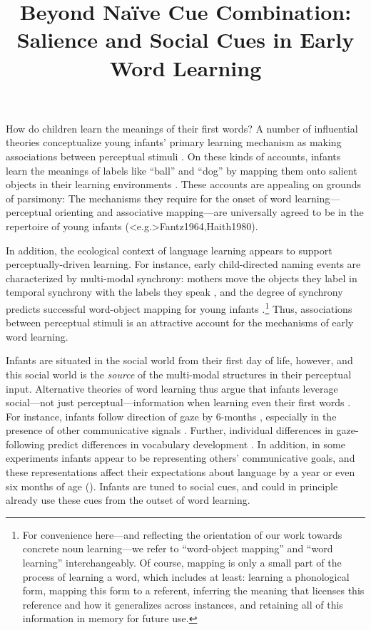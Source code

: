 \documentclass[man,floatsintext]{apa6}
\title{Beyond Na\"{i}ve Cue Combination: Salience and Social Cues in Early Word Learning}
\author{}
\affiliation{}
\begin{document}
\maketitle


How do children learn the meanings of their first words? A number of influential theories conceptualize young infants' primary learning mechanism as making associations between perceptual stimuli \cite{Piaget1952, Vygotsky1978}. On these kinds of accounts, infants learn the meanings of labels like ``ball'' and ``dog'' by mapping them onto salient objects in their learning environments \cite{Werker1998,Smith2000}. These accounts are appealing on grounds of parsimony: The mechanisms they require for the onset of word learning---perceptual orienting and associative mapping---are universally agreed to be in the repertoire of young infants (\citeNP<e.g.>{Fantz1964,Haith1980}). 

In addition, the ecological context of language learning appears to support perceptually-driven learning. For instance, early child-directed naming events are characterized by multi-modal synchrony: mothers move the objects they label in temporal synchrony with the labels they speak \cite{Gogate2000}, and the degree of synchrony predicts successful word-object mapping for young infants \cite{Gogate2006}.\footnote{For convenience here---and reflecting the orientation of our work towards concrete noun learning---we refer to ``word-object mapping'' and ``word learning'' interchangeably. Of course, mapping is only a small part of the process of learning a word, which includes at least: learning a phonological form, mapping this form to a referent, inferring the meaning that licenses this reference and how it generalizes across instances, and retaining all of this information in memory for future use.} Thus, associations between perceptual stimuli is an attractive account for the mechanisms of early word learning.

Infants are situated in the social world from their first day of life, however, and this social world is the \emph{source} of the multi-modal structures in their perceptual input. Alternative theories of word learning thus argue that infants leverage social---not just perceptual---information when learning even their first words \cite{Bruner1983,Bloom1998}. For instance, infants follow direction of gaze by 6-months \cite{Dentremont1997}, especially in the presence of other communicative signals \cite{Senju2008}. Further, individual differences in gaze-following predict differences in vocabulary development \cite{Brooks2008}. In addition, in some experiments infants appear to be representing others' communicative goals, and these representations affect their expectations about language by a year or even six months of age (). Infants are tuned to social cues, and could in principle already use these cues from the outset of word learning.
\end{document}
